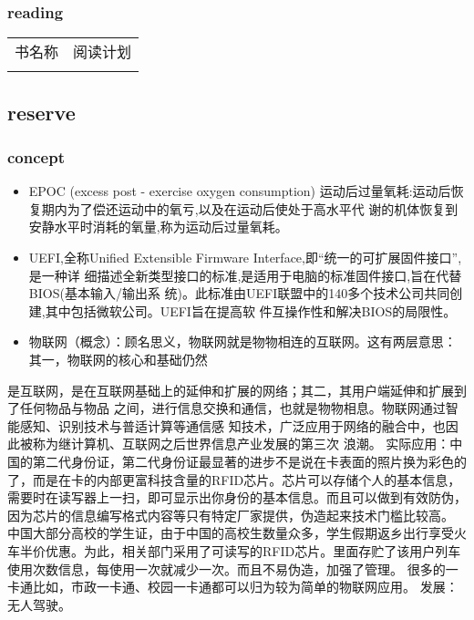 \documentclass[11pt]{article}
\begin{document}
\subsubsection{reading}
\label{sec-1-1-2}

\begin{center}
\begin{tabular}{ll}
书名称 & 阅读计划\\
\\
\end{tabular}
\end{center}

\subsection{reserve}
\label{sec-1-2}
\subsubsection{concept}
\label{sec-1-2-1}
\begin{itemize}
\item EPOC (excess post - exercise oxygen consumption)
运动后过量氧耗:运动后恢复期内为了偿还运动中的氧亏,以及在运动后使处于高水平代
谢的机体恢复到安静水平时消耗的氧量,称为运动后过量氧耗。
\item UEFI,全称Unified Extensible Firmware Interface,即“统一的可扩展固件接口”,是一种详
细描述全新类型接口的标准,是适用于电脑的标准固件接口,旨在代替BIOS(基本输入/输出系
统)。此标准由UEFI联盟中的140多个技术公司共同创建,其中包括微软公司。UEFI旨在提高软
件互操作性和解决BIOS的局限性。
\item 物联网（概念）：顾名思义，物联网就是物物相连的互联网。这有两层意思：其一，物联网的核心和基础仍然
\end{itemize}
是互联网，是在互联网基础上的延伸和扩展的网络；其二，其用户端延伸和扩展到了任何物品与物品
之间，进行信息交换和通信，也就是物物相息。物联网通过智能感知、识别技术与普适计算等通信感
知技术，广泛应用于网络的融合中，也因此被称为继计算机、互联网之后世界信息产业发展的第三次
浪潮。
实际应用：中国的第二代身份证，第二代身份证最显著的进步不是说在卡表面的照片换为彩色的了，而是在卡的内部更富科技含量的RFID芯片。芯片可以存储个人的基本信息，需要时在读写器上一扫，即可显示出你身份的基本信息。而且可以做到有效防伪，因为芯片的信息编写格式内容等只有特定厂家提供，伪造起来技术门槛比较高。
中国大部分高校的学生证，由于中国的高校生数量众多，学生假期返乡出行享受火车半价优惠。为此，相关部门采用了可读写的RFID芯片。里面存贮了该用户列车使用次数信息，每使用一次就减少一次。而且不易伪造，加强了管理。
很多的一卡通比如，市政一卡通、校园一卡通都可以归为较为简单的物联网应用。
发展：无人驾驶。
\end{document}

